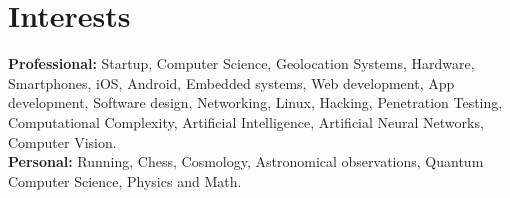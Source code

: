 \documentclass[]{friggeri-cv}
\begin{document}

\section{Interests}
\vspace{-3mm}
\textbf{Professional:} Startup, Computer Science, Geolocation Systems, Hardware, Smartphones, iOS, Android, Embedded systems, Web development, App development, Software design, Networking, Linux, Hacking, Penetration Testing, Computational Complexity, Artificial Intelligence, Artificial Neural Networks, Computer Vision.\\
\textbf{Personal:} Running, Chess, Cosmology, Astronomical observations, Quantum Computer Science, Physics and Math.

\clearpage
\end{document}
